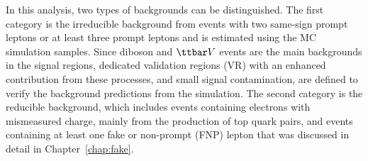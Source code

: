 In this analysis, two types of backgrounds can be distinguished.
 The first category is the irreducible background from events with two same-sign prompt 
leptons or at least three prompt leptons and is estimated using the MC simulation samples. Since diboson and $\ttbar V$ events are the main 
backgrounds in the signal regions, dedicated validation regions (VR) with an enhanced contribution from these processes, and small 
signal contamination, are defined to verify the background predictions from the simulation.%
The second category is the reducible  
background, which includes events containing electrons with mismeasured charge, mainly from the production of top quark pairs, 
and events containing at least one fake or non-prompt (FNP) lepton that 
was discussed in detail in Chapter~\ref{chap:fake}.


